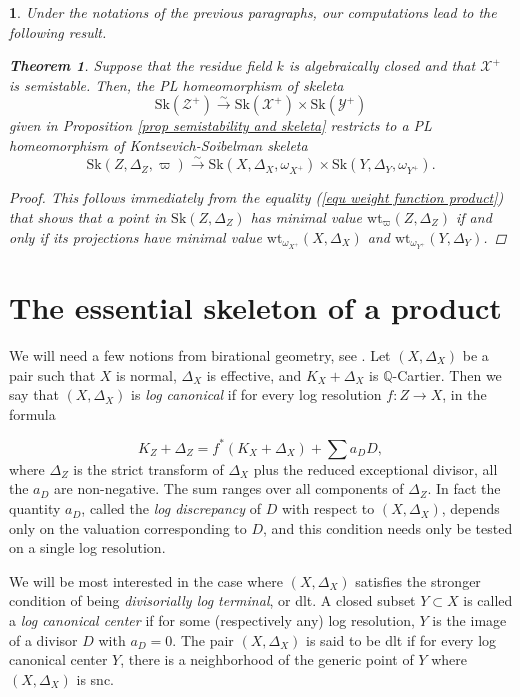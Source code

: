 \documentclass{amsart}%
\numberwithin{equation}{subsection}
\theoremstyle{plain2}
\newtheorem{thm}[equation]{Theorem}
\theoremstyle{definition2}
\theoremstyle{stepstyle}
\theoremstyle{point}
\theoremstyle{subpoint}
\newtheorem{subpoint}[equation]{}%
\newcommand{\spa}[1]{\begin{subpoint}#1\end{subpoint}}           %
\newcommand{\cX}{\ensuremath{\mathscr{X}}}
\newcommand{\cY}{\ensuremath{\mathscr{Y}}}
\newcommand{\cZ}{\ensuremath{\mathscr{Z}}}
\renewcommand{\cY}{\ensuremath{\mathscr{Y}}}
\newcommand{\weight}{\mathrm{wt}}
\newcommand{\Sk}{\mathrm{Sk}}
\begin{document}
\spa{Under the notations of the previous paragraphs, our computations lead to the following result.
\begin{thm}  \label{thm semistability and KS skeleta}
Suppose that the residue field $k$ is algebraically closed and that $\cX^+$ is semistable. Then, the PL homeomorphism of skeleta $$\Sk(\cZ^+) \xrightarrow{\sim} \Sk(\cX^+) \times \Sk(\cY^+)$$ given in Proposition \ref{prop semistability and skeleta} restricts to a PL homeomorphism of Kontsevich-Soibelman skeleta $$\Sk(Z,\Delta_Z, \varpi) \xrightarrow{\sim} \Sk(X,\Delta_X, \omega_{X^+}) \times \Sk(Y,\Delta_Y, \omega_{Y^+}).$$ 
\end{thm}
\begin{proof}
This follows immediately from the equality (\ref{equ weight function product}) that shows that a point in $\Sk(Z,\Delta_Z)$ has minimal value $\weight_{\varpi}(Z,\Delta_Z)$ if and only if its projections have minimal value $\weight_{\omega_{X^+}}(X,\Delta_X)$ and $\weight_{\omega_{Y^+}}(Y,\Delta_Y)$.
\end{proof}
}

\section{The essential skeleton of a product}\label{sec birational}
We will need a few notions from birational geometry, see \cite{KollarMori}. Let $(X,\Delta_X)$ be a pair such that $X$ is normal, $\Delta_X$ is effective, and $K_X+\Delta_X$ is $\mathbb{Q}$-Cartier. Then we say that $(X,\Delta_X)$ is \emph{log canonical} if for every log resolution $f \colon Z \to X$, in the formula

\[
K_Z+\Delta_Z = f^*(K_X+\Delta_X)+\sum a_D D,
\]
where $\Delta_Z$ is the strict transform of $\Delta_X$ plus the reduced exceptional divisor, all the $a_D$ are non-negative. The sum ranges over all components of $\Delta_Z$. In fact the quantity $a_D$, called the \emph{log discrepancy} of $D$ with respect to $(X,\Delta_X)$, depends only on the valuation corresponding to $D$, and this condition needs only be tested on a single log resolution.

We will be most interested in the case where $(X,\Delta_X)$ satisfies the stronger condition of being \emph{divisorially log terminal}, or dlt. A closed subset $Y \subset X$ is called a \emph{log canonical center} if for some (respectively any) log resolution, $Y$ is the image of a divisor $D$ with $a_D=0$. The pair $(X,\Delta_X)$ is said to be dlt if for every log canonical center $Y$, there is a neighborhood of the generic point of $Y$ where $(X,\Delta_X)$ is snc.
\end{document}
